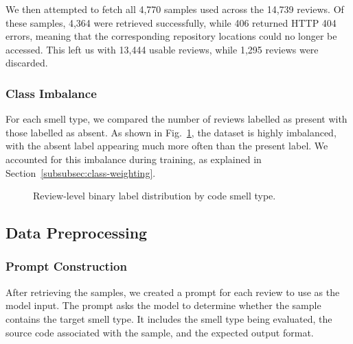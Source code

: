 We then attempted to fetch all 4,770 samples used across the 14,739 reviews. Of these samples, 4,364 were retrieved successfully, while 406 returned HTTP 404 errors, meaning that the corresponding repository locations could no longer be accessed. This left us with 13,444 usable reviews, while 1,295 reviews were discarded.

\subsubsection{Class Imbalance}

For each smell type, we compared the number of reviews labelled as present with those labelled as absent. As shown in Fig.~\ref{fig:class-imbalance}, the dataset is highly imbalanced, with the absent label appearing much more often than the present label. We accounted for this imbalance during training, as explained in Section~\ref{subsubsec:class-weighting}.

\begin{figure}[t]
\centering
{}
\caption{Review-level binary label distribution by code smell type.}
\label{fig:class-imbalance}
\end{figure}

\subsection{Data Preprocessing}
\label{subsec:data-preprocessing}

\subsubsection{Prompt Construction}

After retrieving the samples, we created a prompt for each review to use as the model input. The prompt asks the model to determine whether the sample contains the target smell type. It includes the smell type being evaluated, the source code associated with the sample, and the expected output format.

